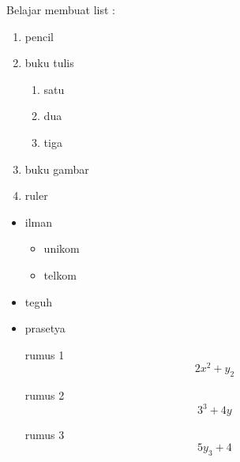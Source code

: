 \documentclass[12pt]{article}
\begin{document}
	Belajar membuat list : 
	\begin{enumerate}
		\item pencil
		\item buku tulis
		\begin{enumerate}
			\item satu
			\item dua
			\item tiga
		\end{enumerate}
		\item buku gambar
		\item ruler
	\end{enumerate}
	\begin{itemize}
		\item ilman 
		\begin{itemize}
			\item unikom
			\item telkom 
		\end{itemize}
		\item teguh  
		\item prasetya
	\end{itemize}
	\begin{itemize}
		\item[rumus 1] $$2x^2+y_2$$
		\item[rumus 2] $$3^3+4y$$
		\item[rumus 3] $$5y_3+4$$
	\end{itemize}
\end{document}
